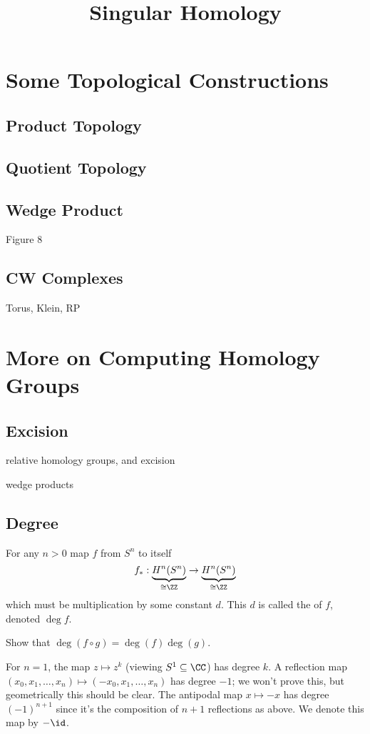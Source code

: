 \documentclass[11pt]{scrreprt}
\begin{document}
\title{Singular Homology}
\maketitle

\chapter{Some Topological Constructions}
\section{Product Topology}
\section{Quotient Topology}
\section{Wedge Product}
Figure 8
\section{CW Complexes}

Torus, Klein, RP


\chapter{More on Computing Homology Groups}

\section{Excision}
relative homology groups, and excision

wedge products


\section{Degree}
For any $n > 0$ map $f$ from $S^n$ to itself
\[ f_\ast : \underbrace{H^n(S^n)}_{\cong \ZZ} \to \underbrace{H^n(S^n)}_{\cong \ZZ} \]
which must be multiplication by some constant $d$.
This $d$ is called the  of $f$, denoted $\deg f$.
\begin{ques}
	Show that $\deg(f \circ g) = \deg(f) \deg(g)$.
\end{ques}

\begin{example}
	[Degree]
	\listhack
	\begin{enumerate}[(a)]
		\ii For $n=1$, the map $z \mapsto z^k$ (viewing $S^1 \subseteq \CC$)
		has degree $k$.
		\ii A reflection map $(x_0, x_1, \dots, x_n) \mapsto (-x_0, x_1, \dots, x_n)$
		has degree $-1$; we won't prove this, but geometrically this should be clear.
		\ii The antipodal map $x \mapsto -x$ has degree $(-1)^{n+1}$
		since it's the composition of $n+1$ reflections as above.
		We denote this map by $-\id$.
	\end{enumerate}
\end{example}
\end{document}
